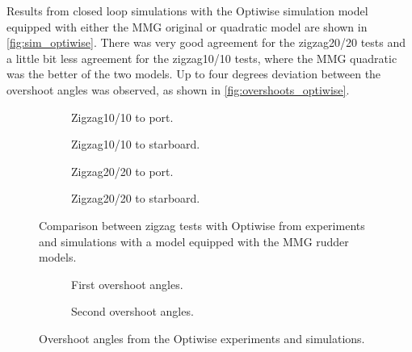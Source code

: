 Results from closed loop simulations with the Optiwise simulation model equipped with either the MMG original or quadratic model are shown in \autoref{fig:sim_optiwise}. There was very good agreement for the zigzag20/20 tests and a little bit less agreement for the zigzag10/10 tests, where the MMG quadratic was the better of the two models. Up to four degrees deviation between the overshoot angles was observed, as shown in \autoref{fig:overshoots_optiwise}.   
\begin{figure}[h]
     \centering
     \begin{subfigure}[b]{0.40\textwidth}
         \centering
         
        \caption{Zigzag10/10 to port.}
        \label{fig:sim_optiwise_10_port}
     \end{subfigure}
     \hfill
     \begin{subfigure}[b]{0.40\textwidth}
         
        \caption{Zigzag10/10 to starboard.}
        \label{fig:sim_optiwise_10_stbd}
     \end{subfigure}
     \vfill
     \begin{subfigure}[b]{0.40\textwidth}
         \centering
         
        \caption{Zigzag20/20 to port.}
        \label{fig:sim_optiwise_20_port}
     \end{subfigure}
     \hfill
     \begin{subfigure}[b]{0.40\textwidth}
         
        \caption{Zigzag20/20 to starboard.}
        \label{fig:sim_optiwise_20_stbd}
     \end{subfigure}
     
        \caption{Comparison between zigzag tests with Optiwise from experiments and simulations with a model equipped with the MMG rudder models.}
        \label{fig:sim_optiwise}
\end{figure}
\begin{figure}[h]
     \centering
     \begin{subfigure}[b]{\textwidth}
         \centering
         
        \caption{First overshoot angles.}
        \label{fig:overhoots1_optiwise}
     \end{subfigure}
     \vfill
     \begin{subfigure}[b]{\textwidth}
         \centering
         
        \caption{Second overshoot angles.}
        \label{fig:overhoots2_optiwise}
     \end{subfigure}
     
        \caption{Overshoot angles from the Optiwise experiments and simulations.}
        \label{fig:overshoots_optiwise}
\end{figure}